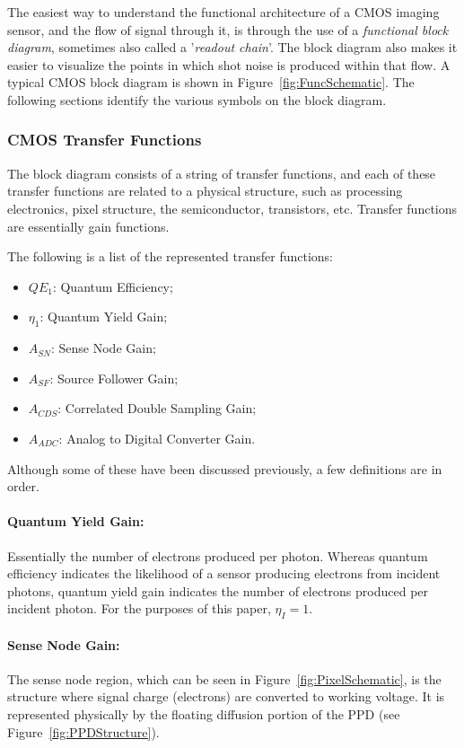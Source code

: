 \documentclass[10pt]{article}
\begin{document}
The easiest way to understand the functional architecture of a CMOS imaging sensor, and the flow of signal through it, is through the use of a \emph{functional block diagram}, sometimes also called a '\emph{readout chain}'. The block diagram also makes it easier to visualize the points in which shot noise is produced within that flow. A typical CMOS block diagram is shown in Figure~\ref{fig:FuncSchematic}. The following sections identify the various symbols on the block diagram.


\subsubsection{CMOS Transfer Functions}

The block diagram consists of a string of transfer functions, and each of these transfer functions are related to a physical structure, such as processing electronics, pixel structure, the semiconductor, transistors, etc. Transfer functions are essentially gain functions.

The following is a list of the represented transfer functions:

\begin{itemize}[noitemsep]
\item \textbf{\boldmath$QE_1$}: Quantum Efficiency;
\item \textbf{\boldmath$\eta_1$}: Quantum Yield Gain;
\item \textbf{\boldmath$A_{SN}$}: Sense Node Gain; 
\item \textbf{\boldmath$A_{SF}$}: Source Follower Gain;
\item \textbf{\boldmath$A_{CDS}$}: Correlated Double Sampling Gain;
\item \textbf{\boldmath$A_{ADC}$}: Analog to Digital Converter Gain.
\end{itemize}

Although some of these have been discussed previously, a few definitions are in order.

\paragraph{Quantum Yield Gain:} Essentially the number of electrons produced per photon. Whereas quantum efficiency indicates the likelihood of a sensor producing electrons from incident photons, quantum yield gain indicates the number of electrons produced per incident photon. For the purposes of this paper, $\eta_I = 1$.

\paragraph{Sense Node Gain:} The sense node region, which can be seen in Figure~\ref{fig:PixelSchematic}, is the structure where signal charge (electrons) are converted to working voltage. It is represented physically by the floating diffusion portion of the PPD (see Figure~\ref{fig:PPDStructure}).
\end{document}
